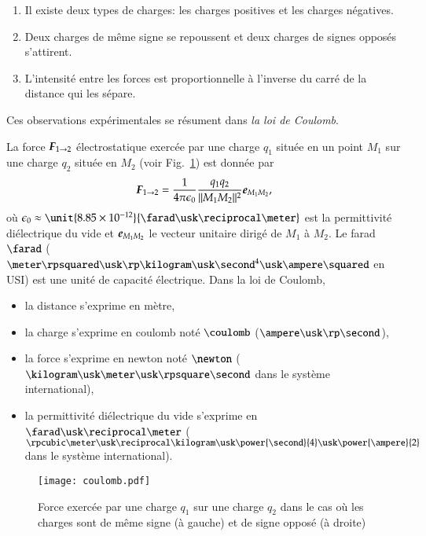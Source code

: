 \begin{enumerate}
	\item Il existe deux types de charges: les charges positives et les
	  charges négatives.
	\item Deux charges de même signe se repoussent et deux charges de signes
	  opposés s'attirent.
	\item L'intensité entre les forces est proportionnelle à l'inverse 
	  du carré de la distance qui les sépare.
\end{enumerate}
Ces observations expérimentales se résument dans \emph{la loi de Coulomb}. 


\begin{defn}
	La force $\vecf_{1 \rightarrow 2}$ électrostatique
	exercée par une charge $q_1$ située en un point $M_1$ sur une 
	charge $q_2$ située en $M_2$ (voir Fig.~\ref{fig:coulomb}) est donnée par
	\begin{equation}
		\label{eq:loi_coulomb}
		\vecf_{1 \rightarrow 2} = \dfrac{1}{4\pi\epsilon_0}
	                                \dfrac{q_1 q_2}{||M_1M_2||^2}
					\mitbf{e}_{M_1M_2},
	\end{equation}
	où $\epsilon_0 \approx \unit{8.85 \times 10^{-12}}
	{\farad \usk \reciprocal \meter}$ 
	est la permittivité diélectrique
	du vide et $\mitbf{e}_{M_1M_2}$ le vecteur unitaire dirigé de $M_1$ à
	$M_2$. Le farad $\farad$ ($\meter \rpsquared \usk \rp \kilogram
	\usk \second^4 \usk \ampere \squared$ en USI)
	est une unité de capacité électrique.
	Dans la loi de Coulomb,
	\begin{itemize}
		\item la distance s'exprime en mètre,
		\item la charge s'exprime en coulomb noté $\coulomb$
		($\ampere \usk \rp \second$),
		\item la force s'exprime en newton noté $\newton$ 
		  ($\kilogram \usk \meter
		  \usk \rpsquare \second$ dans le système international),
		\item la permittivité diélectrique du vide s'exprime en 
		  $\farad \usk \reciprocal \meter$ 
		  ($\rpcubic \meter \usk \reciprocal \kilogram \usk 
		  \power{\second}{4} \usk \power{\ampere}{2}$ dans le système
		  international).
	\end{itemize}

\end{defn}

\begin{figure}[h!]
	\centering
	\texttt{[image: coulomb.pdf]}
	\caption{Force exercée par une charge $q_1$ sur une charge $q_2$ dans
	         le cas où les charges sont de même signe (à gauche) et de 
	 	signe opposé (à droite)}%
	\label{fig:coulomb}
\end{figure}


